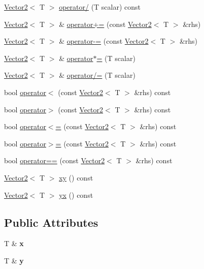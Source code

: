 \begin{DoxyCompactItemize}
\item 
\mbox{\hyperlink{class_vector2}{Vector2}}$<$ T $>$ \mbox{\hyperlink{class_vector2_aae901abf0c2c7f0c772d8cb69213f628}{operator/}} (T scalar) const
\item 
\mbox{\hyperlink{class_vector2}{Vector2}}$<$ T $>$ \& \mbox{\hyperlink{class_vector2_a198ab8bb7f0e0be8905869ccc5b2bf0e}{operator+=}} (const \mbox{\hyperlink{class_vector2}{Vector2}}$<$ T $>$ \&rhs)
\item 
\mbox{\hyperlink{class_vector2}{Vector2}}$<$ T $>$ \& \mbox{\hyperlink{class_vector2_a1722e051fa3c354749c2c4c5c14b9c8e}{operator-\/=}} (const \mbox{\hyperlink{class_vector2}{Vector2}}$<$ T $>$ \&rhs)
\item 
\mbox{\hyperlink{class_vector2}{Vector2}}$<$ T $>$ \& \mbox{\hyperlink{class_vector2_ac310f14122b41cbbbb3d4eac98c81f00}{operator$\ast$=}} (T scalar)
\item 
\mbox{\hyperlink{class_vector2}{Vector2}}$<$ T $>$ \& \mbox{\hyperlink{class_vector2_a9e79272d8b7b39e8d8eafa6f4cbad04e}{operator/=}} (T scalar)
\item 
bool \mbox{\hyperlink{class_vector2_abeb4df28fbd42c319b3e5529a1805e90}{operator$<$}} (const \mbox{\hyperlink{class_vector2}{Vector2}}$<$ T $>$ \&rhs) const
\item 
bool \mbox{\hyperlink{class_vector2_ac550f020f264f8a8058ad3c623c60d40}{operator$>$}} (const \mbox{\hyperlink{class_vector2}{Vector2}}$<$ T $>$ \&rhs) const
\item 
bool \mbox{\hyperlink{class_vector2_a0a798a144b107a4a7964da13c1ada290}{operator$<$=}} (const \mbox{\hyperlink{class_vector2}{Vector2}}$<$ T $>$ \&rhs) const
\item 
bool \mbox{\hyperlink{class_vector2_aad131ea8361750d0fd577c268ed45cc6}{operator$>$=}} (const \mbox{\hyperlink{class_vector2}{Vector2}}$<$ T $>$ \&rhs) const
\item 
bool \mbox{\hyperlink{class_vector2_a45c07c01d5704a8f7e9b55077034e4f8}{operator==}} (const \mbox{\hyperlink{class_vector2}{Vector2}}$<$ T $>$ \&rhs) const
\item 
\mbox{\hyperlink{class_vector2}{Vector2}}$<$ T $>$ \mbox{\hyperlink{class_vector2_a318be8911fa2fbb1887f95196d26c6e8}{xy}} () const
\item 
\mbox{\hyperlink{class_vector2}{Vector2}}$<$ T $>$ \mbox{\hyperlink{class_vector2_a45bce734de6f2bc8fc9f0ca6a8bad7a1}{yx}} () const
\end{DoxyCompactItemize}
\subsection*{Public Attributes}
\begin{DoxyCompactItemize}
\item 
\mbox{\label{class_vector2_ace8900bfc3ab1d1b6628caf68a6485f3}} 
T \& {\bfseries x}
\item 
\mbox{\label{class_vector2_aaad9fb99aa442f610f065cde229da3bc}} 
T \& {\bfseries y}
\end{DoxyCompactItemize}
